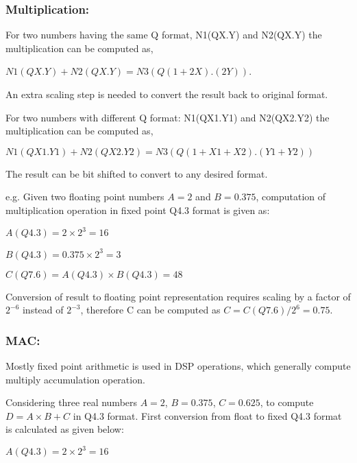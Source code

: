 \vspace{0.25cm}
\subsubsection{Multiplication:}


\noindent For two numbers having the same Q format, N1(QX.Y) and N2(QX.Y) the multiplication can be computed as,


$N1(QX.Y)+N2(QX.Y)= N3(Q(1+2X).(2Y))$.

\noindent An extra scaling step is needed to convert the result back to original format.

\vspace{.25cm}
\noindent For two numbers with different Q format: N1(QX1.Y1) and N2(QX2.Y2) the multiplication can be computed as,

$N1(QX1.Y1)+N2(QX2.Y2)= N3(Q(1+X1+X2).(Y1+Y2))$

\noindent The result can be bit shifted to convert to any desired format.

\vspace{0.25cm}
\noindent e.g. Given two floating point numbers $A=2$ and $B=0.375$, computation of multiplication operation in fixed point Q4.3 format is given as:

\noindent $A(Q4.3)= 2\times 2^{3}= 16$

\noindent $B(Q4.3)= 0.375\times 2^{3}=3$

\noindent $C(Q7.6)= A(Q4.3)\times B(Q4.3)=48$

\noindent Conversion of result to floating point representation requires scaling by a factor of $2^{-6}$ instead of $2^{-3}$, therefore C can be computed as $C= C(Q7.6)/2^{6}= 0.75$.

\vspace{0.25cm}
\subsubsection{MAC:}

\noindent Mostly fixed point arithmetic is used in DSP operations, which generally compute multiply accumulation operation.

\vspace{0.25cm}
\noindent Considering three real numbers $A=2$, $B=0.375$, $C=0.625$, to compute $D=A\times B+C$ in Q4.3 format. First conversion from float to fixed Q4.3 format is calculated as given below:

\noindent $A(Q4.3)=2\times 2^{3}=16$

